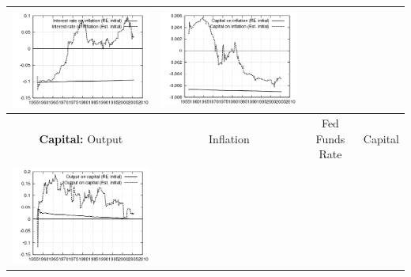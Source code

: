 \documentclass{beamer}
\begin{document}
{\begin{tabular}{|cccc|}
  \includegraphics[scale=0.17]{plots2/cap_initest_Interest_rate_on_inflation.png} & 
  \includegraphics[scale=0.17]{plots2/cap_initest_Capital_on_inflation.png} \\ \hline
  \small{\textbf{Capital:} Output} & \small{Inflation} & \small{Fed Funds Rate} & \small{Capital} \\ \hline
  \includegraphics[scale=0.17]{plots2/cap_initest_Output_on_capital.png} &

\end{tabular}}
\end{document}
